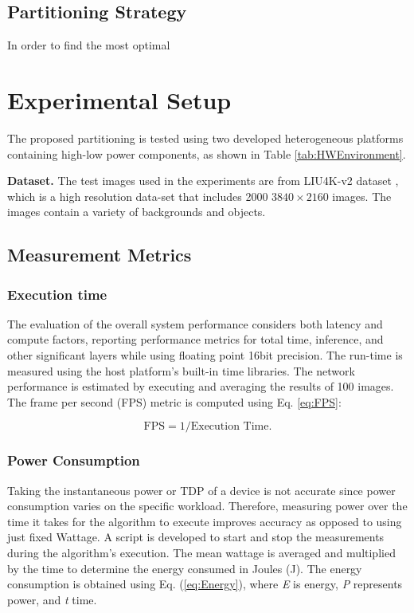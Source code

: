 \documentclass[]{spie}  %
\begin{document}
\subsection{Partitioning Strategy}
In order to find the most optimal 




\section{Experimental Setup}
 
The proposed partitioning is tested using two developed heterogeneous platforms containing high-low power components, as shown in Table \ref{tab:HWEnvironment}.

\textbf{Dataset.} The test images used in the experiments are from LIU4K-v2 dataset \cite{LiuliuYan19}, which is a high resolution data-set that includes 2000 $3840\times2160$ images. The images contain a variety of backgrounds and objects. 



\subsection{Measurement Metrics}
\subsubsection{Execution time}
The evaluation of the overall system performance considers both latency and compute factors, reporting performance metrics for total time, inference, and other significant layers while using floating point 16bit precision. The run-time is measured using the host platform's built-in time libraries. The network performance is estimated by executing and averaging the results of 100 images. The frame per second (FPS) metric is computed using Eq. \ref{eq:FPS}: 

\begin{equation}\label{eq:FPS}
\text{FPS}= 1/\text{Execution Time}.
\end{equation}

\subsubsection{Power Consumption}

Taking the instantaneous power or TDP of a device is not accurate since power consumption varies on the specific workload. Therefore, measuring power over the time it takes for the algorithm to execute improves accuracy as opposed to using just fixed Wattage. A script is developed to start and stop the measurements during the algorithm's execution. The mean wattage is averaged and multiplied by the time to determine the energy consumed in Joules (J). The energy consumption is obtained using Eq. (\ref{eq:Energy}), where \textit{E} is energy, \textit{P} represents power, and \textit{t} time.
\end{document}
